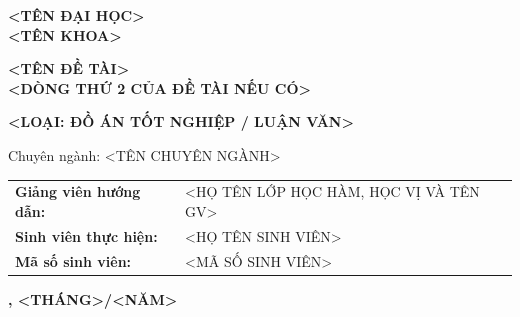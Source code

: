 \begin{titlepage}
    \centering %
    
    {\large\bfseries
    <TÊN ĐẠI HỌC> \\
    <TÊN KHOA> \par
    }
    
    \vspace{0.5cm} %
    
    \noindent\makebox[\linewidth]{\rule{0.3\textwidth}{0.4pt}} %
    
    \vspace{1.75cm} %
    
    
    \vspace{1.5cm} %
    
    {\LARGE\bfseries
    <TÊN ĐỀ TÀI> \\
    <DÒNG THỨ 2 CỦA ĐỀ TÀI NẾU CÓ> \par
    }
    
    \vspace{1.25cm}
    
    {\Large\bfseries <LOẠI: ĐỒ ÁN TỐT NGHIỆP / LUẬN VĂN> \par}
    \vspace{0.5cm}
    {\large Chuyên ngành: <TÊN CHUYÊN NGÀNH> \par}
    
    \vfill %
    
    \begin{tabular}{l l}
        \textbf{Giảng viên hướng dẫn:}   & <HỌ TÊN LỚP HỌC HÀM, HỌC VỊ VÀ TÊN GV> \\
        \textbf{Sinh viên thực hiện:} & <HỌ TÊN SINH VIÊN> \\
        \textbf{Mã số sinh viên:}     & <MÃ SỐ SINH VIÊN>
    \end{tabular}
    
    \vspace{2cm}
    
    {\large\bfseries <TÊN THÀNH PHỐ>, <THÁNG>/<NĂM> \par}

\end{titlepage}
